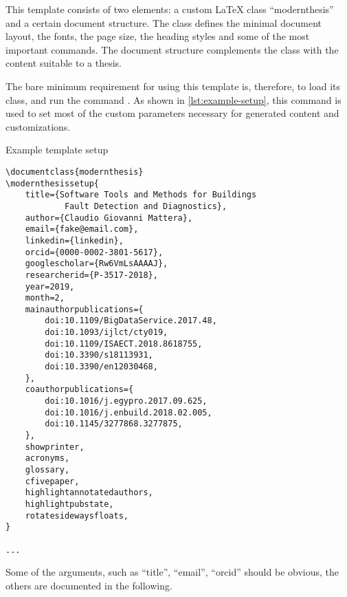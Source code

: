 This template consists of two elements: a custom \LaTeX{} class \enquote{modernthesis} and a certain document structure.
The class defines the minimal document layout, \ie the fonts, the page size, the heading styles and some of the most important commands.
The document structure complements the class with the content suitable to a \phd thesis.

The bare minimum requirement for using this template is, therefore, to load its class, and run the command \texttt{\modernthesissetup}.
As shown in \cref{lst:example-setup}, this command is used to set most of the custom parameters necessary for generated content and customizations.

\begin{listing}
\caption{Example template setup}
\label{lst:example-setup}
\centering
\begin{verbatim}
\documentclass{modernthesis}
\modernthesissetup{
    title={Software Tools and Methods for Buildings
            Fault Detection and Diagnostics},
    author={Claudio Giovanni Mattera},
    email={fake@email.com},
    linkedin={linkedin},
    orcid={0000-0002-3801-5617},
    googlescholar={Rw6VmLsAAAAJ},
    researcherid={P-3517-2018},
    year=2019,
    month=2,
    mainauthorpublications={
        doi:10.1109/BigDataService.2017.48,
        doi:10.1093/ijlct/cty019,
        doi:10.1109/ISAECT.2018.8618755,
        doi:10.3390/s18113931,
        doi:10.3390/en12030468,
    },
    coauthorpublications={
        doi:10.1016/j.egypro.2017.09.625,
        doi:10.1016/j.enbuild.2018.02.005,
        doi:10.1145/3277868.3277875,
    },
    showprinter,
    acronyms,
    glossary,
    cfivepaper,
    highlightannotatedauthors,
    highlightpubstate,
    rotatesidewaysfloats,
}

...

\end{verbatim}
\end{listing}

Some of the arguments, such as \enquote{title}, \enquote{email}, \enquote{orcid} should be obvious, the others are documented in the following.

